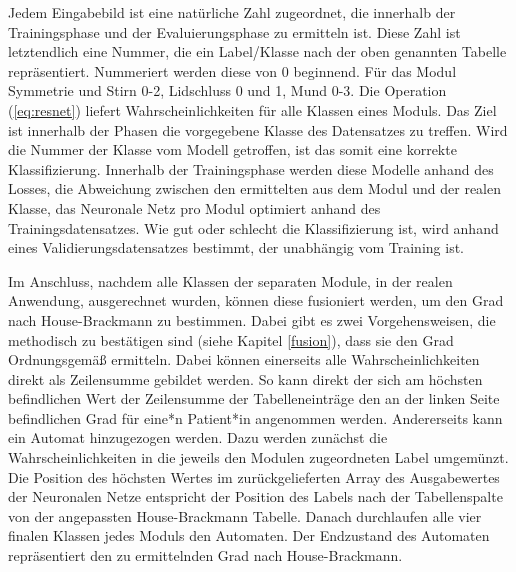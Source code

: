 Jedem Eingabebild ist eine natürliche Zahl zugeordnet, die innerhalb der Trainingsphase und der Evaluierungsphase zu ermitteln ist. Diese Zahl ist letztendlich eine
Nummer, die ein Label/Klasse nach der oben genannten Tabelle repräsentiert. Nummeriert werden diese von 0 beginnend. Für das Modul Symmetrie und Stirn 0-2, Lidschluss 0 und 1, Mund 0-3. Die Operation (\ref{eq:resnet}) liefert Wahrscheinlichkeiten für alle Klassen eines Moduls. Das Ziel ist innerhalb der Phasen die vorgegebene Klasse des Datensatzes zu treffen. Wird die Nummer der Klasse vom Modell getroffen, ist das somit eine korrekte Klassifizierung. Innerhalb der Trainingsphase werden diese Modelle anhand des Losses, die Abweichung zwischen den ermittelten aus dem Modul und der realen Klasse, das Neuronale Netz pro Modul optimiert anhand des Trainingsdatensatzes. Wie gut oder schlecht die Klassifizierung ist, wird anhand eines Validierungsdatensatzes bestimmt, der unabhängig vom Training ist.

Im Anschluss, nachdem alle Klassen der separaten Module, in der realen Anwendung, ausgerechnet wurden, können diese fusioniert werden, um den Grad nach House-Brackmann zu bestimmen. Dabei gibt es zwei Vorgehensweisen, die methodisch zu bestätigen sind (siehe Kapitel \ref{fusion}), dass sie den Grad Ordnungsgemäß ermitteln. Dabei können einerseits alle Wahrscheinlichkeiten direkt als Zeilensumme gebildet werden. So kann direkt der sich am höchsten befindlichen Wert der Zeilensumme der Tabelleneinträge den an der linken Seite befindlichen Grad für eine*n Patient*in angenommen werden. Andererseits kann ein Automat hinzugezogen werden. Dazu werden zunächst die Wahrscheinlichkeiten in die jeweils den Modulen zugeordneten Label umgemünzt. Die Position des höchsten Wertes im zurückgelieferten Array des Ausgabewertes der Neuronalen Netze entspricht der Position des Labels nach der Tabellenspalte von der angepassten House-Brackmann Tabelle. Danach durchlaufen alle vier finalen Klassen jedes Moduls den Automaten. Der Endzustand des Automaten repräsentiert den zu ermittelnden Grad nach House-Brackmann.


